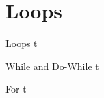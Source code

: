 \documentclass[../lecture3-flowofcontrol.tex]{subfiles}
\begin{document}
\section{Loops}


\begin{frame}[fragile]{Loops}
t
\end{frame}


\begin{frame}[fragile]{While and Do-While}
t
\end{frame}


\begin{frame}[fragile]{For}
t
\end{frame}

\end{document}
